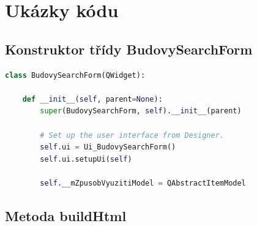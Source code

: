 \documentclass[a4paper,12pt,oneside]{book}
\begin{document}
\clearpage
\listoffigures

\clearpage
\listoftables

\clearpage
\lstlistoflistings

\newpage
\appendix

\setcounter{page}{1}   	%

\chapter{Ukázky kódu}

\section{Konstruktor třídy BudovySearchForm}

\begin{lstlisting}[language=Python, 
		    keywordstyle=\color{blue}\ttfamily,
		    stringstyle=\color{red}\ttfamily,
		    commentstyle=\color{green}\ttfamily, morekeywords={qDebug,QString,QgsVectorLayer,QgsMapLayerRegistry,QMessageBox,self},
		    label=l_budovySearchForm_konstruktor]
class BudovySearchForm(QWidget):

    def __init__(self, parent=None):
        super(BudovySearchForm, self).__init__(parent)

        # Set up the user interface from Designer.
        self.ui = Ui_BudovySearchForm()
        self.ui.setupUi(self)

        self.__mZpusobVyuzitiModel = QAbstractItemModel
\end{lstlisting}


\section{Metoda buildHtml}
\end{document}
